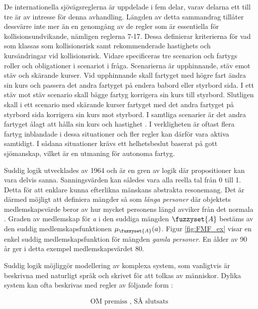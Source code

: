 De internationella sjövägsreglerna är uppdelade i fem delar, varav delarna ett till tre är av intresse för denna avhandling. Längden av detta sammandrag tillåter dessvärre inte mer än en genomgång av de regler som är essentiella för kollisionsundvikande, nämligen reglerna 7-17. Dessa definierar kriterierna för vad som klassas som kollisionsrisk samt rekommenderade hastighets och kursändringar vid kollisionsrisk. Vidare specificeras tre scenarion och fartygs roller och obligationer i scenariot i fråga. Scenarierna är upphinnande, stäv emot stäv och skärande kurser. Vid upphinnande skall fartyget med högre fart ändra sin kurs och passera det andra fartyget på endera babord eller styrbord sida. I ett stäv mot stäv scenario skall bägge fartyg korrigera sin kurs till styrbord. Slutligen skall i ett scenario med skärande kurser fartyget med det andra fartyget på styrbord sida korrigera sin kurs mot styrbord. I samtliga scenarier är det andra fartyget ålagt att hålla sin kurs och hastighet \cite{colreg}. I verkligheten är oftast flera fartyg inblandade i dessa situationer och fler regler kan därför vara aktiva samtidigt. I sådana situationer krävs ett helhetsbeslut baserat på gott sjömanskap, vilket är en utmaning för autonoma fartyg.


Suddig logik utvecklades av \textcite{zadeh1996fuzzy} 1964 och är en gren av logik där propositioner kan vara delvis sanna. Sanningsvärden kan således vara alla reella tal från 0 till 1. Detta för att  enklare kunna efterlikna mänskans abstrakta resonemang.  Det är därmed möjligt att definiera mängder så som  \textit{långa personer}  där objektets medlemskapsvärde beror av hur mycket personens längd avviker från det normala \cite{chen2000introduction}.  Graden av medlemskap för \textit{a} i den suddiga mängden $\fuzzyset{A}$ bestäms av den suddig medlemskapsfunktionen $\mu_{\fuzzyset{A}}(a)$.   Figur \ref{fig:FMF_ex} visar en enkel suddig medlemskapsfunktion för mängden \textit{gamla personer}. En ålder av 90 år ger i detta exempel medlemskapsvärdet 80.

Suddig logik möjliggör  modellering av komplexa system, som vanligtvis är beskrivna med naturligt språk och skrivet för att tolkas av människor. Dylika system kan ofta beskrivas med regler av följande form :

\begin{equation}
    \text{OM premiss , SÅ slutsats}
\end{equation}



